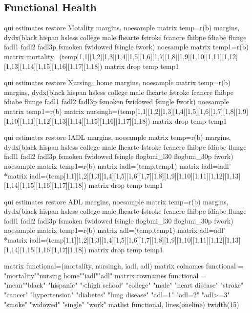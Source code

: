 \documentclass{article}
\begin{document}
\subsection*{\centering Functional Health}
\begin{Statacode}
qui estimates restore Motality
margins, noesample
matrix temp=r(b)
margins, dydx(black hispan hsless college male fhearte fstroke fcancre fhibpe fdiabe flunge fadl1 fadl2 fadl3p fsmoken fwidowed fsingle fwork) noesample
matrix temp1=r(b)
matrix mortality=(temp[1,1][1,2][1,3][1,4][1,5][1,6][1,7][1,8][1,9][1,10][1,11][1,12][1,13][1,14][1,15][1,16][1,17]\.\.[1,18])
matrix drop temp temp1

qui estimates restore Nursing_home
margins, noesample
matrix temp=r(b)
margins, dydx(black hispan hsless college male fhearte fstroke fcancre fhibpe fdiabe flunge fadl1 fadl2 fadl3p fsmoken fwidowed fsingle fwork) noesample
matrix temp1=r(b)
matrix nursingh=(temp[1,1][1,2][1,3][1,4][1,5][1,6][1,7][1,8][1,9][1,10][1,11][1,12][1,13][1,14][1,15][1,16][1,17]\.\.[1,18])
matrix drop temp temp1

qui estimates restore IADL
margins, noesample
matrix temp=r(b)
margins, dydx(black hispan hsless college male fhearte fstroke fcancre fhibpe fdiabe flunge fadl1 fadl2 fadl3p fsmoken fwidowed fsingle flogbmi_l30 flogbmi_30p fwork) noesample
matrix temp1=r(b)
matrix iadl=(temp,temp1)
matrix iadl=iadl'
*matrix iadl=(temp[1,1][1,2][1,3][1,4][1,5][1,6][1,7][1,8][1,9][1,10][1,11][1,12][1,13][1,14][1,15][1,16][1,17]\.\.[1,18])
matrix drop temp temp1

qui estimates restore ADL
margins, noesample
matrix temp=r(b)
margins, dydx(black hispan hsless college male fhearte fstroke fcancre fhibpe fdiabe flunge fadl1 fadl2 fadl3p fsmoken fwidowed fsingle flogbmi_l30 flogbmi_30p fwork) noesample
matrix temp1=r(b)
matrix adl=(temp,temp1)
matrix adl=adl'
*matrix iadl=(temp[1,1][1,2][1,3][1,4][1,5][1,6][1,7][1,8][1,9][1,10][1,11][1,12][1,13][1,14][1,15][1,16][1,17]\.\.[1,18])
matrix drop temp temp1

matrix functional=(mortality, nursingh, iadl, adl)
matrix colnames functional = "mortality""nursing home""iadl""adl"
matrix rownames functional = "mean""black" "hispanic" "<high school" "college" "male" "heart disease" "stroke" "cancer" "hypertension" "diabetes" "lung disease" "adl=1" "adl=2" "adl>=3" "smoke" "widowed" "single" "work"
matlist functional, lines(oneline) twidth(15)  
\end{Statacode}
\end{document}
